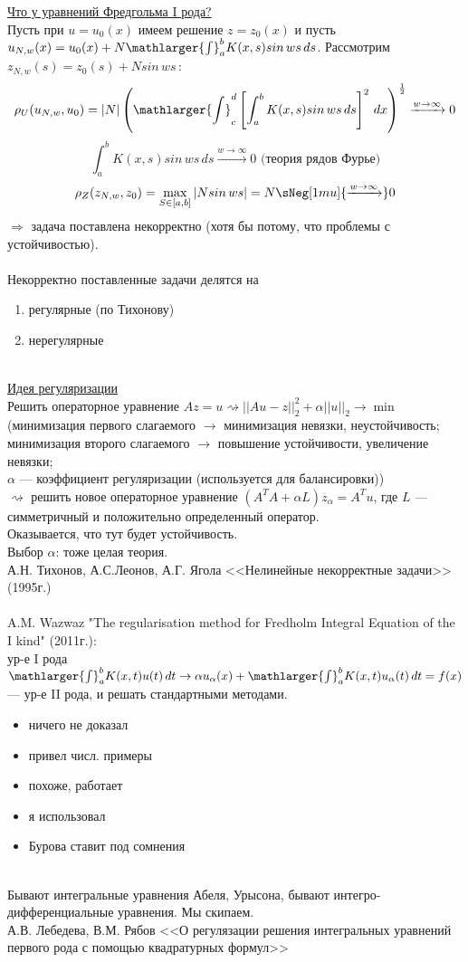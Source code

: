 \underline{Что у уравнений Фредгольма I рода?}\\
Пусть при  \(u=u_0(x)\) имеем решение \( z=z_0(x)\) и пусть \(u_{N,w}(x)=u_0(x)+N\mathlarger{\int}_a^bK(x,s)sin\,ws\,ds\).
Рассмотрим \(z_{N,w}(s)=z_0(s)+Nsin\,ws\,\):
\[\rho_U(u_{N,w}, u_0)=|N| \left (\mathlarger{\int}_c^d \left [ \int_a^b K(x,s)sin\,ws\,ds \right ]^2\,dx \right )^\frac{1}{2} \xrightarrow{w\rightarrow \infty}{0}\]
\[\int_a^b K(x,s)sin\,ws\,ds \xrightarrow{w\rightarrow \infty}{0} \textrm{ (теория рядов Фурье)}\]
\[\rho_Z(z_{N,w},z_0) = \max_{S\in[a,b]} |Nsin\,ws|=N \sNeg[1mu]{\xrightarrow{w\rightarrow\infty}}0  \]
\(\Rightarrow\) задача поставлена некорректно (хотя бы потому, что проблемы с устойчивостью).\\\\
Некорректно поставленные задачи делятся на \begin{enumerate}
    \item регулярные (по Тихонову)
    \item нерегулярные
\end{enumerate}\\
\underline{Идея регуляризации}\\
Решить операторное уравнение \(Az=u\rightsquigarrow ||Au-z||_2^2+\alpha||u||_2\rightarrow \min\)\\
(минимизация первого слагаемого $\rightarrow$ минимизация невязки, неустойчивость;\\ минимизация второго слагаемого $\rightarrow$ повышение устойчивости, увеличение невязки;\\$\alpha$ --- коэффициент регуляризации (используется для балансировки))\\
$\rightsquigarrow$ решить новое операторное уравнение \((A^TA+\alpha L)z_{\alpha}=A^Tu\),
где $L$ --- симметричный и положительно определенный оператор.\\
Оказывается, что тут будет устойчивость.\\
Выбор $\alpha$: тоже целая теория.\\
А.Н. Тихонов, А.С.Леонов, А.Г. Ягола <<Нелинейные некорректные задачи>> (1995г.)\\\\
A.M. Wazwaz "The regularisation method for Fredholm Integral Equation of the I kind"  (2011г.):\\
ур-е I рода \(\mathlarger{\int}_a^bK(x,t)u(t)\,dt \rightarrow \alpha u_{\alpha}(x)+\mathlarger{\int}_a^bK(x,t)u_{\alpha}(t)\,dt = f(x)\) --- ур-е II рода, и решать стандартными методами.
\begin{itemize}
    \item ничего не доказал
    \item привел числ. примеры
    \item похоже, работает
    \item я использовал
    \item Бурова ставит под сомнения
\end{itemize}\\
Бывают интегральные уравнения Абеля, Урысона, бывают интегро-дифференциальные уравнения. Мы скипаем.\\
А.В. Лебедева, В.М. Рябов <<О регулязации решения интегральных уравнений первого рода с помощью квадратурных формул>>

